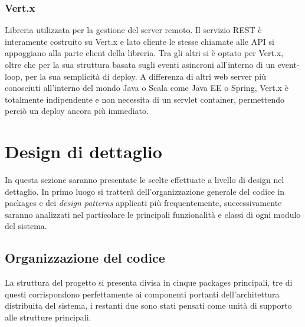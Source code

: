 	 \subsubsection{Vert.x}\label{subsub:tecnologie:vert.x}
	  Libreria utilizzata per la gestione del server remoto. Il servizio REST è interamente costruito su Vert.x e lato cliente le stesse chiamate alle API si appoggiano alla parte client della libreria.
	  Tra gli altri si è optato per Vert.x, oltre che per la sua struttura basata sugli eventi asincroni all'interno di un event-loop, per la sua semplicità di deploy. A differenza di altri web server più conosciuti all'interno del mondo Java o Scala come Java EE o Spring, Vert.x è totalmente
	  indipendente e non necessita di un servlet container, permettendo perciò un deploy ancora più immediato.
        \clearpage
    \section{Design di dettaglio}\label{sec:design:details}
     	In questa sezione saranno presentate le scelte effettuate a livello di design nel dettaglio. In primo luogo si tratterà dell'organizzazione generale del codice in packages e dei \textit{design patterns} applicati più frequentemente, successivamente saranno analizzati nel particolare le principali funzionalità e classi di ogni modulo del sistema.

         \subsection {Organizzazione del codice}\label{subsec:details:codestructure}
         La struttura del progetto si presenta divisa in cinque packages principali, tre di questi corrispondono perfettamente ai componenti portanti dell'architettura distribuita del sistema, i restanti due sono stati pensati come unità di supporto alle strutture principali.

